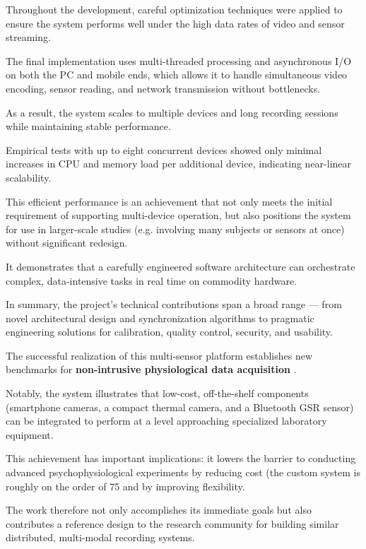 \begin{itemize}
Throughout the development, careful optimization techniques were applied to
ensure the system performs well under the high data rates of video and sensor
streaming.

The final implementation uses multi-threaded processing and asynchronous I/O on
both the PC and mobile ends, which allows it to handle simultaneous video
encoding, sensor reading, and network transmission without bottlenecks.

As a result, the system scales to multiple devices and long recording sessions
while maintaining stable performance.

Empirical tests with up to eight concurrent devices showed only minimal
increases in CPU and memory load per additional device, indicating near-linear
scalability.

This efficient performance is an achievement that not only meets the initial
requirement of supporting multi-device operation, but also positions the system
for use in larger-scale studies (e.g. involving many subjects or sensors at
once) without significant redesign.

It demonstrates that a carefully engineered software architecture can
orchestrate complex, data-intensive tasks in real time on commodity hardware.

\end{itemize}

In summary, the project's technical contributions span a broad range --- from
novel architectural design and synchronization algorithms to pragmatic
engineering solutions for calibration, quality control, security, and usability.

The successful realization of this multi-sensor platform establishes new benchmarks for \textbf{non-intrusive physiological data acquisition}
.

Notably, the system illustrates that low-cost, off-the-shelf components
(smartphone cameras, a compact thermal camera, and a Bluetooth GSR sensor) can
be integrated to perform at a level approaching specialized laboratory
equipment.

This achievement has important implications: it lowers the barrier to conducting
advanced psychophysiological experiments by reducing cost (the custom system is
roughly on the order of 75%
and by improving flexibility.

The work therefore not only accomplishes its immediate goals but also
contributes a reference design to the research community for building similar
distributed, multi-modal recording systems.

